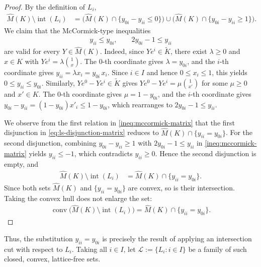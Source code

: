 \documentclass{article}
\renewcommand{\L}{\mathcal{L}}
\begin{document}
\begin{proof}
    By the definition of $L_i$,
    \begin{align}
        \hat M(K) \setminus \operatorname{int}(L_i)
        &= \bigl(\hat M(K) \cap \{y_{0i} - y_{ii} \leq 0\}\bigr)
        \cup \bigl(\hat M(K) \cap \{y_{0i} - y_{ii} \geq 1\}\bigr). \label{eq:ls-disjunction-matrix}
    \end{align}
    We claim that the McCormick-type inequalities
    \begin{align}
        y_{ii} \leq y_{0i}, \qquad 2y_{0i} - 1 \leq y_{ii} \label{ineq:mccormick-matrix}
    \end{align}
    are valid for every $Y \in \hat M(K)$. Indeed, since $Ye^i \in \tilde K$, there exist $\lambda \geq 0$ and $x \in K$ with $Ye^i = \lambda \binom{1}{x}$. The $0$-th coordinate gives $\lambda = y_{0i}$, and the $i$-th coordinate gives $y_{ii} = \lambda x_i = y_{0i}\, x_i$. Since $i \in I$ and hence $0 \leq x_i \leq 1$, this yields $0 \leq y_{ii} \leq y_{0i}$. Similarly, $Ye^0 - Ye^i \in \tilde K$ gives $Ye^0 - Ye^i = \mu\binom{1}{x'}$ for some $\mu \geq 0$ and $x' \in K$. The $0$-th coordinate gives $\mu = 1 - y_{0i}$, and the $i$-th coordinate gives $y_{0i} - y_{ii} = (1-y_{0i})x'_i \leq 1 - y_{0i}$, which rearranges to $2y_{0i} - 1 \leq y_{ii}$.

    We observe from the first relation in \eqref{ineq:mccormick-matrix} that the first disjunction in \eqref{eq:ls-disjunction-matrix} reduces to $\hat M(K) \cap \{y_{ii} = y_{0i}\}$.
    For the second disjunction, combining $y_{0i} - y_{ii} \geq 1$ with $2y_{0i} - 1 \leq y_{ii}$ in \eqref{ineq:mccormick-matrix} yields $y_{ii} \leq -1$,
    which contradicts $y_{ii} \geq 0$. Hence the second disjunction is empty, and
    \begin{align}
        \hat M(K) \setminus \operatorname{int}(L_i) &= \hat M(K) \cap \{y_{ii} = y_{0i}\}.
    \end{align}
    Since both sets $\hat M(K)$ and $\{y_{ii} = y_{0i}\}$ are convex, so is their intersection. Taking the convex hull does not enlarge the set:
    \begin{align}
        \operatorname{conv}\bigl(\hat M(K) \setminus \operatorname{int}(L_i)\bigr) = \hat M(K) \cap \{y_{ii} = y_{0i}\}.
    \end{align}
\end{proof}

Thus, the substitution $y_{ii} = y_{0i}$ is precisely the result of applying an intersection cut with respect to $L_i$. Taking all $i \in I$, let $\L := \{L_i : i \in I\}$ be a family of such closed, convex, lattice-free sets.
\end{document}
